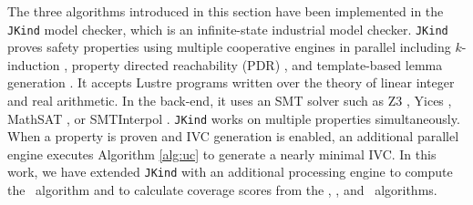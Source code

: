 The three algorithms introduced in this section have been implemented in the \texttt{JKind} \cite{jkind} model checker, which is an infinite-state industrial model checker. \texttt{JKind} proves safety properties using multiple cooperative engines in parallel including $k$-induction \cite{SheeranSS00}, property directed reachability (PDR) \cite{Een2011:PDR}, and template-based lemma generation \cite{Kahsai2011}. It accepts
Lustre programs written over the theory of linear integer and real
arithmetic. In the back-end, it uses an SMT solver such as
Z3 \cite{DeMoura08:z3}, Yices \cite{Dutertre06:yices},
MathSAT \cite{Cimatti2013:MathSAT}, or SMTInterpol \cite{Christ2012:SMTInterpol}.
\texttt{JKind} works on multiple properties simultaneously. When a
property is proven and IVC generation is enabled, an additional
parallel engine executes Algorithm \ref{alg:uc} to generate a nearly minimal
IVC.
In this work, we have extended \texttt{JKind} with an additional processing engine to compute the \mustalg\ algorithm and to calculate coverage scores from the \ucalg, \ucbfalg, and \mustalg\ algorithms.


